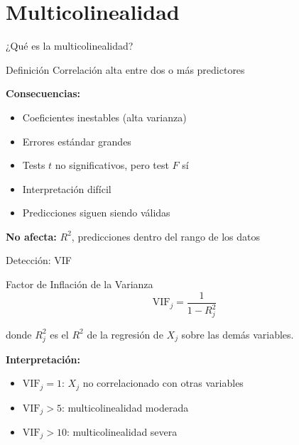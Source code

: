 \documentclass[aspectratio=169]{beamer}
\begin{document}
\section{Multicolinealidad}

\begin{frame}{¿Qué es la multicolinealidad?}
\begin{block}{Definición}
Correlación alta entre dos o más predictores
\end{block}

\vspace{0.3cm}
\textbf{Consecuencias:}
\begin{itemize}
    \item Coeficientes inestables (alta varianza)
    \item Errores estándar grandes
    \item Tests $t$ no significativos, pero test $F$ sí
    \item Interpretación difícil
    \item Predicciones siguen siendo válidas
\end{itemize}

\vspace{0.5cm}
\textbf{No afecta:} $R^2$, predicciones dentro del rango de los datos
\end{frame}

\begin{frame}{Detección: VIF}
\begin{block}{Factor de Inflación de la Varianza}
\[
\text{VIF}_j = \frac{1}{1 - R^2_j}
\]
\end{block}

donde $R^2_j$ es el $R^2$ de la regresión de $X_j$ sobre las demás variables.

\vspace{0.5cm}
\textbf{Interpretación:}
\begin{itemize}
    \item $\text{VIF}_j = 1$: $X_j$ no correlacionado con otras variables
    \item $\text{VIF}_j > 5$: multicolinealidad moderada
    \item $\text{VIF}_j > 10$: multicolinealidad severa
\end{itemize}
\end{frame}
\end{document}
